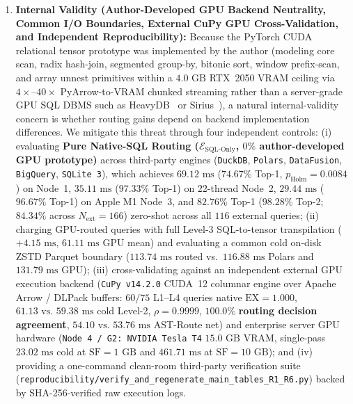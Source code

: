 \documentclass[10pt,a4paper]{article}
\begin{document}
\begin{enumerate}[leftmargin=1.5em,itemsep=0.8pt]
    \item \textbf{Internal Validity (Author-Developed GPU Backend Neutrality, Common I/O Boundaries, External CuPy GPU Cross-Validation, and Independent Reproducibility):} Because the PyTorch CUDA relational tensor prototype was implemented by the author (modeling core scan, radix hash-join, segmented group-by, bitonic sort, window prefix-scan, and array unnest primitives within a $4.0\text{ GB}$ RTX~2050 VRAM ceiling via $4\times\text{--}40\times$ PyArrow-to-VRAM chunked streaming rather than a server-grade GPU SQL DBMS such as HeavyDB~\cite{root2019mapd} or Sirius~\cite{yogatama2025sirius}), a natural internal-validity concern is whether routing gains depend on backend implementation differences. We mitigate this threat through four independent controls: (i) evaluating \textbf{Pure Native-SQL Routing ($\mathcal{E}_{\text{SQL-Only}}$, $0\%$ author-developed GPU prototype)} across third-party engines (\texttt{DuckDB}, \texttt{Polars}, \texttt{DataFusion}, \texttt{BigQuery}, \texttt{SQLite~3}), which achieves $69.12\text{ ms}$ ($74.67\%$ Top-1, $p_{\text{Holm}}=0.0084$) on Node~1, $35.11\text{ ms}$ ($97.33\%$ Top-1) on 22-thread Node~2, $29.44\text{ ms}$ ($96.67\%$ Top-1) on Apple M1 Node~3, and $82.76\%$ Top-1 ($98.28\%$ Top-2; $84.34\%$ across $N_{\text{ext}}=166$) zero-shot across all $116$ external queries; (ii) charging GPU-routed queries with full Level-3 SQL-to-tensor transpilation ($+4.15\text{ ms}$, $61.11\text{ ms}$ GPU mean) and evaluating a common cold on-disk ZSTD Parquet boundary ($113.74\text{ ms}$ routed vs.\ $116.88\text{ ms}$ Polars and $131.79\text{ ms}$ GPU); (iii) cross-validating against an independent external GPU execution backend (\texttt{CuPy v14.2.0} CUDA~12 columnar engine over Apache Arrow / DLPack buffers: $60/75$ L1--L4 queries native $\text{EX}=1.000$, $61.13\text{ vs.\ }59.38\text{ ms}$ cold Level-2, $\rho=0.9999$, $\mathbf{100.0\%}$ \textbf{routing decision agreement}, $54.10\text{ vs.\ }53.76\text{ ms}$ AST-Route net) and enterprise server GPU hardware (\texttt{Node~4 / G2: NVIDIA Tesla~T4} $15.0\text{ GB}$ VRAM, single-pass $23.02\text{ ms}$ cold at $\text{SF}=1\text{ GB}$ and $461.71\text{ ms}$ at $\text{SF}=10\text{ GB}$); and (iv) providing a one-command clean-room third-party verification suite (\texttt{reproducibility/verify\_\allowbreak{}and\_\allowbreak{}regenerate\_\allowbreak{}main\_\allowbreak{}tables\_\allowbreak{}R1\_\allowbreak{}R6.py}) backed by SHA-256-verified raw execution logs.

\end{enumerate}
\end{document}
